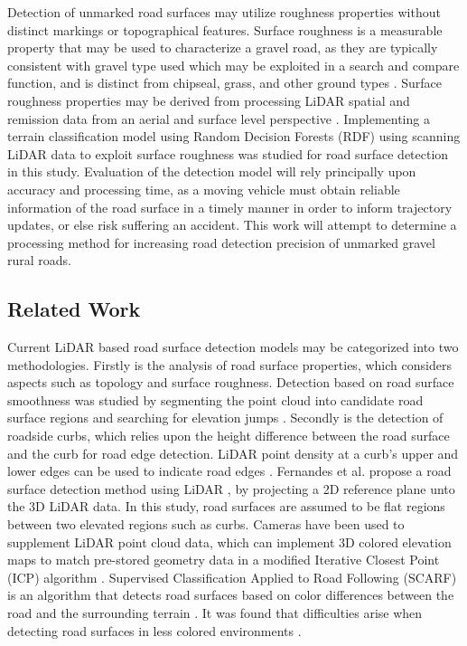 \documentclass[journal,onecolumn]{IEEEtran}
\begin{document}
	{Detection of unmarked road surfaces may utilize roughness properties without distinct markings or topographical features. Surface roughness is a measurable property that may be used to characterize a gravel road, as they are typically consistent with gravel type used \cite{skorseth_gravel_nodate} which may be exploited in a search and compare function, and is distinct from chipseal, grass, and other ground types \cite{wan_road_2007, levi_3d_2012_light, levi_3d_2012_terrain}. Surface roughness properties may be derived from processing LiDAR spatial and remission data from an aerial and surface level perspective \cite{wan_road_2007, levi_3d_2012_light, levi_3d_2012_terrain, pollyea_experimental_2012,rychkov_computational_2012,lague_accurate_2013,brubaker_use_2013,turner_estimation_2014,campbell_lidar-based_2017,shepard_roughness_2001,tegowski_statistical_2016,sock_probabilistic_2016,milenkovic_roughness_2018,yadav_extraction_2017, yadav_rural_2018}. Implementing a terrain classification model using Random Decision Forests (RDF) using scanning LiDAR data to exploit surface roughness was studied for road surface detection in this study. Evaluation of the detection model will rely principally upon accuracy and processing time, as a moving vehicle must obtain reliable information of the road surface in a timely manner in order to inform trajectory updates, or else risk suffering an accident. This work will attempt to determine a processing method for increasing road detection precision of unmarked gravel rural roads.}
		
\subsection{Related Work}
	
	{Current LiDAR based road surface detection models may be categorized into two methodologies. Firstly is the analysis of road surface properties, which considers aspects such as topology and surface roughness. Detection based on road surface smoothness was studied by segmenting the point cloud into candidate road surface regions and searching for elevation jumps \cite{liu_new_2013}. Secondly is the detection of roadside curbs, which relies upon the height difference between the road surface and the curb for road edge detection. LiDAR point density at a curb's upper and lower edges can be used to indicate road edges \cite{ibrahim_curb-based_2012}. Fernandes et al. propose a road surface detection method using LiDAR \cite{fernandes_road_2014}, by projecting a 2D reference plane unto the 3D LiDAR data. In this study, road surfaces are assumed to be flat regions between two elevated regions such as curbs. Cameras have been used to supplement LiDAR point cloud data, which can implement 3D colored elevation maps to match pre-stored geometry data in a modified Iterative Closest Point (ICP) algorithm \cite{manz_detection_2011}. Supervised Classification Applied to Road Following (SCARF) is an algorithm that detects road surfaces based on color differences between the road and the surrounding terrain \cite{crisman_scarf_1993}. It was found that difficulties arise when detecting road surfaces in less colored environments \cite{crisman_scarf_1993,manz_detection_2011}.}
	
\end{document}
